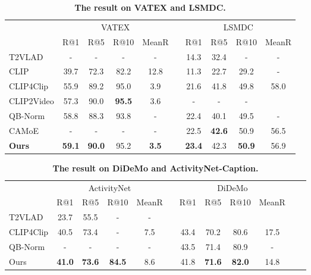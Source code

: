 




\setlength{\tabcolsep}{4pt}
\begin{table}
\begin{center}
\caption{\textbf{The result on VATEX and LSMDC.}}
\label{table:fourbenchmarks}
\begin{tabular}{lccccccccc}
\hline\noalign{\smallskip}
\multirow{2}{*}{Model} & \multicolumn{4}{c}{VATEX} & & \multicolumn{4}{c}{LSMDC} \\[0.5pt]
\cline{2-5} \cline{7-10}
 & R@1 & R@5 & R@10 & MeanR & & R@1 & R@5 & R@10 & MeanR\\
\noalign{\smallskip}
\hline
\noalign{\smallskip}
T2VLAD\cite{wang2021t2vlad} & - & - & - & - &  & 14.3 & 32.4 & - & -\\
CLIP & 39.7 & 72.3 & 82.2 & 12.8 & & 11.3 & 22.7 & 29.2 & -\\
CLIP4Clip & 55.9 & 89.2 & 95.0 & 3.9 & & 21.6 & 41.8 & 49.8 & 58.0\\
CLIP2Video & 57.3 & 90.0 & \textbf{95.5} & 3.6 &   & - & - & - \\
QB-Norm & 58.8 & 88.3 & 93.8 & - & & 22.4 & 40.1 & 49.5 & -\\
CAMoE & - & - & - & - &  & 22.5 & {\bf 42.6} & 50.9 & 56.5\\
\textbf{Ours} & \textbf{59.1} & \textbf{90.0} & 95.2 & \textbf{3.5} & & {\bf 23.4}  & 42.3 &  {\bf 50.9} & 56.9\\
\hline
\end{tabular}
\end{center}
\end{table}
\setlength{\tabcolsep}{1.4pt}


\setlength{\tabcolsep}{4pt}
\begin{table}
\begin{center}
\caption{\textbf{The result on DiDeMo and ActivityNet-Caption.}}
\label{table:fourbenchmarks}
\begin{tabular}{lccccccccccc}
\hline\noalign{\smallskip}
\multirow{2}{*}{Model} & \multicolumn{4}{c}{ActivityNet} & & \multicolumn{4}{c}{DiDeMo} \\ 
\cline{2-5} \cline{7-10}
 & R@1 & R@5 & R@10 & MeanR & & R@1 & R@5 & R@10 & MeanR\\
\noalign{\smallskip}
\hline
\noalign{\smallskip}
T2VLAD\cite{wang2021t2vlad} & 23.7 & 55.5 & - & - & &\\
CLIP4Clip & 40.5 & 73.4 & - & 7.5 & & 43.4 & 70.2 & 80.6 & 17.5\\
QB-Norm & - & - & - & - & & 43.5 & 71.4 & 80.9 & -\\
Ours & {\bf 41.0} & {\bf 73.6} &  {\bf 84.5} & 8.6 & & 41.8 & {\bf 71.6} &  {\bf 82.0} & 14.8\\
\hline
\end{tabular}
\end{center}
\end{table}
\setlength{\tabcolsep}{1.4pt}




